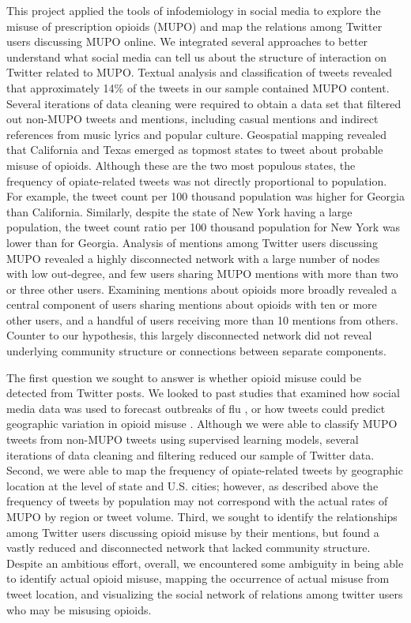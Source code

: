 \documentclass[sigconf]{acmart}
\begin{document}
This project applied the tools of infodemiology in social media to explore 
the misuse of prescription opioids (MUPO) and map the relations among Twitter 
users discussing MUPO online. We integrated several approaches to better 
understand what social media can tell us about the structure of interaction 
on Twitter related to MUPO. Textual analysis and classification of tweets 
revealed that approximately 14\% of the tweets in our sample contained MUPO 
content. Several iterations of data cleaning were required to obtain a data 
set that filtered out non-MUPO tweets and mentions, including casual mentions 
and indirect references from music lyrics and popular culture. Geospatial 
mapping revealed that California and Texas emerged as topmost states to tweet 
about probable misuse of opioids. Although these are the two most populous 
states, the frequency of opiate-related tweets was not directly proportional to 
population. For example, the tweet count per 100 thousand population was higher 
for Georgia than California. Similarly, despite the state of New York having a 
large population, the tweet count ratio per 100 thousand population for New York
was lower than for Georgia. Analysis of mentions among Twitter users discussing 
MUPO revealed a highly disconnected network with a large number of nodes with 
low out-degree, and few users sharing MUPO mentions with more than two or three 
other users. Examining mentions about opioids more broadly revealed a central 
component of users sharing mentions about opioids with ten or more other users, 
and a handful of users receiving more than 10 mentions from others. Counter to 
our hypothesis, this largely disconnected network did not reveal underlying 
community structure or connections between separate components. 


The first question we sought to answer is whether opioid misuse could be 
detected from Twitter posts. We looked to past studies that examined how 
social media data was used to forecast outbreaks of flu 
\cite{culotta10, paul14}, or how tweets could predict geographic variation 
in opioid misuse \cite{chary17, sarker16}. Although we were able to classify 
MUPO tweets from non-MUPO tweets using supervised learning models, several 
iterations of data cleaning and filtering reduced our sample of Twitter data. 
Second, we were able to map the frequency of opiate-related tweets by geographic 
location at the level of state and U.S. cities; however, as described above the 
frequency of tweets by population may not correspond with the actual rates of 
MUPO by region or tweet volume. Third, we sought to identify the relationships 
among Twitter users discussing opioid misuse by their mentions, but found a 
vastly reduced and disconnected network that lacked community structure. Despite 
an ambitious effort, overall, we encountered some ambiguity in being able to 
identify actual opioid misuse, mapping the occurrence of actual misuse from 
tweet location, and visualizing the social network of relations among twitter 
users who may be misusing opioids.
\end{document}
